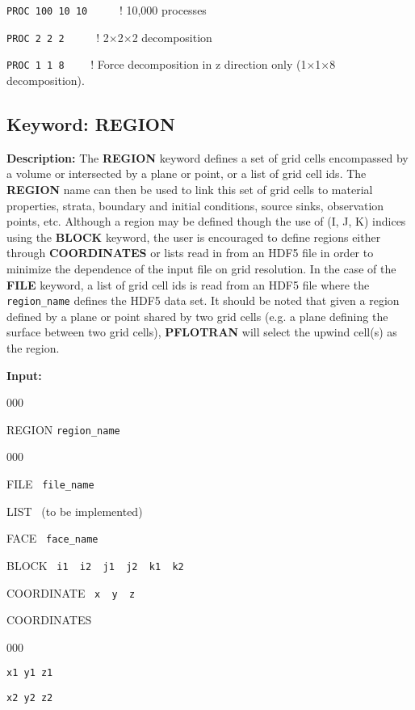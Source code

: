 \begin{mdframed}


{\tt PROC 100 10 10} \ \ \ \ \ ! 10,000 processes

{\tt PROC 2 2 2} \ \ \ \ \ ! 2$\times$2$\times$2 decomposition

{\tt PROC 1 1 8} \ \ \ \ ! Force decomposition in z direction only (1$\times$1$\times$8 decomposition).

\end{mdframed}

\hyperlink{target_key}{\return}


\newpage
\protect\hypertarget{target_region}{}


\subsection{Keyword: REGION}

{\noindent\bf Description:}
The {\bf REGION} keyword defines a set of grid cells encompassed by a volume or intersected by a plane or point, or a list of grid cell ids.  The {\bf REGION} name can then be used to link this set of grid cells to material properties, strata, boundary and initial conditions, source sinks, observation points, etc.  Although a region may be defined though the use of (I, J, K) indices using the {\bf BLOCK} keyword, the user is encouraged to define regions either through {\bf COORDINATES} or lists read in from an HDF5 file in order to minimize the dependence of the input file on grid resolution.  In the case of the {\bf FILE} keyword, a list of grid cell ids is read from an HDF5 file where the {\tt region\_name} defines the HDF5 data set.  It should be noted that given a region defined by a plane or point shared by two grid cells (e.g. a plane defining the surface between two grid cells), {\bf PFLOTRAN} will select the upwind cell(s) as the region.

{\noindent\bf Input:}

\begin{deflist}{000}
\item[REGION] {\tt region\_name}
\begin{deflist}{000}
\item[FILE] \ {\tt file\_name}
\item[LIST] \ (to be implemented)
\item[FACE] \ {\tt face\_name}
\item[BLOCK] \ {\tt i1 \ i2 \ j1 \ j2 \ k1 \ k2}
\item[COORDINATE] \ {\tt x \ y \ z}
\item[COORDINATES] ~
\begin{deflist}{000}
\item[\tt x1 y1 z1]
\item[\tt x2 y2 z2]
\end{deflist}
\item[\keyend]
\end{deflist}
\item[\keyend]
\end{deflist}

